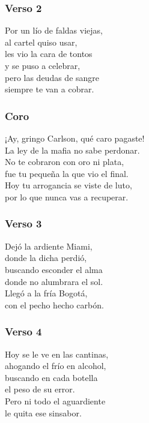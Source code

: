 \subsubsection{Verso 2}\label{verso-2}

Por un lío de faldas viejas,\\
al cartel quiso usar,\\
les vio la cara de tontos\\
y se puso a celebrar,\\
pero las deudas de sangre\\
siempre te van a cobrar.

\subsubsection{Coro}\label{coro}

¡Ay, gringo Carlson, qué caro pagaste!\\
La ley de la mafia no sabe perdonar.\\
No te cobraron con oro ni plata,\\
fue tu pequeña la que vio el final.\\
Hoy tu arrogancia se viste de luto,\\
por lo que nunca vas a recuperar.

\subsubsection{Verso 3}\label{verso-3}

Dejó la ardiente Miami,\\
donde la dicha perdió,\\
buscando esconder el alma\\
donde no alumbrara el sol.\\
Llegó a la fría Bogotá,\\
con el pecho hecho carbón.

\subsubsection{Verso 4}\label{verso-4}

Hoy se le ve en las cantinas,\\
ahogando el frío en alcohol,\\
buscando en cada botella\\
el peso de su error.\\
Pero ni todo el aguardiente\\
le quita ese sinsabor.

